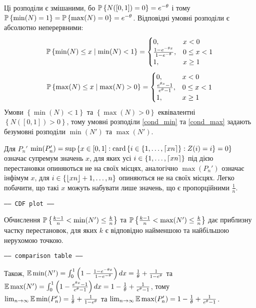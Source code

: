 Ці розподіли є змішаними, бо $\P{N([0, 1]) = 0} = e^{-\theta}$ і тому
$\P{\min(N) = 1} = \P{\max(N) = 0} = e^{-\theta}$. 
Відповідні умовні розподіли є абсолютно неперервними:
\begin{gather}\label{cond_min}
    \P{\min(N) \leq x \mid \min(N) < 1} = 
    \begin{cases}
        0, & x < 0 \\
        \frac{1-e^{-\theta x}}{1-e^{-\theta}}, & 0 \leq x < 1 \\
        1, & x \geq 1
    \end{cases}
\end{gather}
\begin{gather}\label{cond_max}
    \P{\max(N) \leq x \mid \max(N) > 0} = 
    \begin{cases}
        0, & x < 0 \\
        \frac{e^{\theta x} - 1}{e^{\theta} - 1}, & 0 \leq x < 1 \\
        1, & x \geq 1
    \end{cases}
\end{gather}
Умови $\left\{ \min(N) < 1\right\}$ та $\left\{ \max(N) > 0\right\}$
еквівалентні $\left\{N([0, 1]) > 0 \right\}$, тому 
умовні розподіли \eqref{cond_min} та \eqref{cond_max} 
задають безумовні розподіли $\min(N')$ та $\max(N')$.

Для $P_n'$ $\min(P_n') = \sup\left\{x \in [0, 1] : \card\left\{
    i \in \left\{1,\dots,\ceil*{x n}\right\} : Z(i) = i
\right\} = 0\right\}$ означає супремум значень $x$, для яких усі
$i \in \left\{1,\dots,\ceil*{x n}\right\}$ під дією 
перестановки опиняються не на своїх місцях,
аналогічно $\max(P_n')$ означає інфімум $x$, для
$i \in \left\{\floor*{x n}+1,\dots,n\right\}$ опиняються не на своїх місцях. 
Легко побачити, що такі $x$ можуть набувати лише значень, що є пропорційними $\frac{1}{n}$.
\begin{center}
    \texttt{----- CDF plot -----}
\end{center}
Обчислення $\P{\frac{k-1}{n} < \min(N') \leq \frac{k}{n}}$ та
$\P{\frac{k-1}{n} < \max(N') \leq \frac{k}{n}}$ дає приблизну частку
перестановок, для яких $k$ є відповідно найменшою та найбільшою нерухомою точкою.
\begin{center}
    \texttt{----- comparison table -----}
\end{center}

Також, 
$\E\min(N') = \int_0^1 \left(1 -  \frac{1-e^{-\theta x}}{1-e^{-\theta}}\right) dx = \frac{1}{\theta} + \frac{1}{1-e^{\theta}}$ та
$\E\max(N') = \int_0^1 \left(1 -  \frac{e^{\theta x} - 1}{e^{\theta} - 1}\right) dx = 1 - \frac{1}{\theta} + \frac{1}{e^{\theta} - 1}$,
тому $\lim_{n\to\infty} \E\min(P_n') = \frac{1}{\theta} + \frac{1}{1-e^{\theta}}$ та
$\lim_{n\to\infty} \E\max(P_n') = 1 - \frac{1}{\theta} + \frac{1}{e^{\theta} - 1}$.

